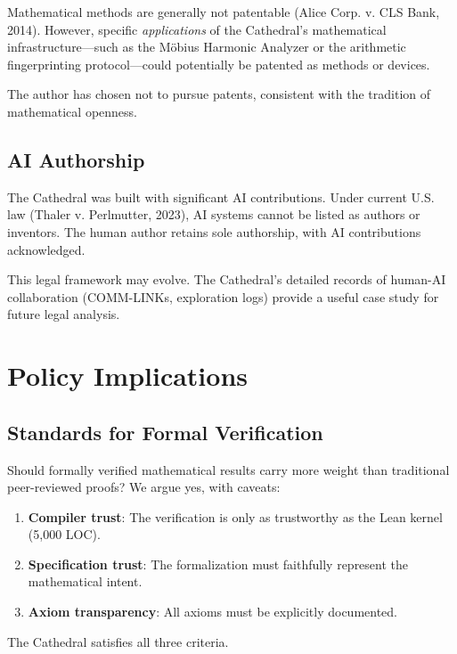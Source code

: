 \documentclass[11pt,a4paper]{article}
\begin{document}
Mathematical methods are generally not patentable (Alice Corp. v.
CLS Bank, 2014). However, specific \emph{applications} of the
Cathedral's mathematical infrastructure---such as the M\"obius
Harmonic Analyzer or the arithmetic fingerprinting protocol---could
potentially be patented as methods or devices.

The author has chosen not to pursue patents, consistent with the
tradition of mathematical openness.

\subsection{AI Authorship}

The Cathedral was built with significant AI contributions. Under
current U.S. law (Thaler v. Perlmutter, 2023), AI systems cannot
be listed as authors or inventors. The human author retains sole
authorship, with AI contributions acknowledged.

This legal framework may evolve. The Cathedral's detailed records
of human-AI collaboration (COMM-LINKs, exploration logs) provide
a useful case study for future legal analysis.

\section{Policy Implications}

\subsection{Standards for Formal Verification}

Should formally verified mathematical results carry more weight
than traditional peer-reviewed proofs? We argue yes, with caveats:

\begin{enumerate}
  \item \textbf{Compiler trust}: The verification is only as
    trustworthy as the Lean kernel (5{,}000 LOC).
  \item \textbf{Specification trust}: The formalization must
    faithfully represent the mathematical intent.
  \item \textbf{Axiom transparency}: All axioms must be
    explicitly documented.
\end{enumerate}

The Cathedral satisfies all three criteria.
\end{document}
